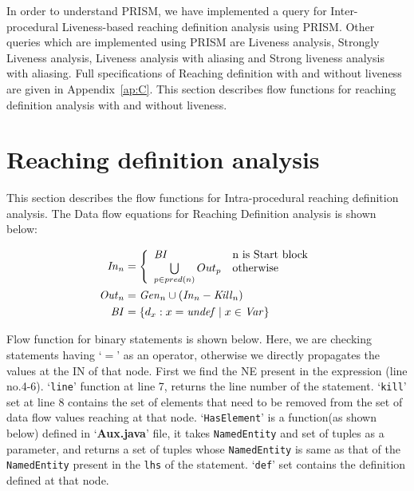 \documentclass[11pt,a4paper,openright]{report}
\begin{document}
In order to understand PRISM, we have implemented a query for Inter-procedural Liveness-based reaching definition analysis using PRISM. Other queries which are 
implemented using PRISM are Liveness analysis, Strongly Liveness analysis, Liveness analysis with aliasing and Strong liveness analysis with aliasing.
Full specifications of Reaching definition with and without liveness are given in Appendix~\ref{ap:C}. This section describes flow functions for reaching definition analysis with and without
liveness.

\section{Reaching definition analysis}
This section describes the flow functions for Intra-procedural reaching definition analysis.
The Data flow equations for Reaching Definition analysis is shown below:

\begin{equation}
\begin{split}
\mbox{\textit{In}}_n &= \left\{ \begin{array}{ll}
	  \mbox{\textit{BI}} & \mbox{n is Start block}\\
	  \bigcup\limits_{p \in pred(n)} Out_p & \mbox{otherwise}
	  \end{array} \right.\\ 
\mbox{\textit{Out}}_n &= \mbox{\textit{Gen}}_n \cup (\mbox{\textit{In}}_n - \mbox{\textit{Kill}}_n) \\
\mbox{\textit{BI}} &= \{d_x : x = \mbox{\textit{undef}} \mid x \in \mbox{\textit{Var}}\} \\
\end{split} 
\end{equation}
  
Flow function for binary statements is shown below. Here, we are checking statements having `$=$' as an operator, otherwise we  
directly propagates the values at the IN of that node. First we find the NE present in the expression (line no.4-6). `\texttt{line}'
 function at line 7, returns the line number of the statement. `\texttt{kill}' set at line 8 contains the set of elements that need 
 to be removed from the set of data flow values reaching at that node. `\texttt{HasElement}' is a function(as shown below) defined in
`\textbf{Aux.java}' file, it takes \texttt{NamedEntity} and set of tuples as a parameter, and returns a set of tuples whose \texttt{NamedEntity} is same
as that of the \texttt{NamedEntity} present in the \texttt{lhs} of the statement. `\texttt{def}' set contains the definition defined at that node.
\end{document}
